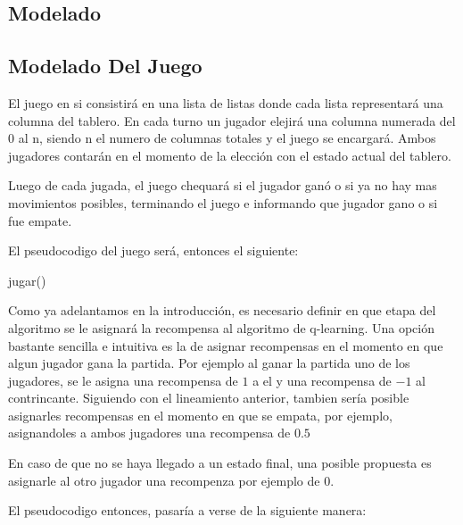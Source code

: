 \subsection{Modelado}


\subsection{Modelado Del Juego}

El juego en si consistirá en una lista de listas donde cada lista representará una columna del tablero. En cada turno un jugador elejirá una columna numerada del 0 al n, siendo n el numero de columnas totales y el juego se encargará. Ambos jugadores contarán en el momento de la elección con el estado actual del tablero.

Luego de cada jugada, el juego chequará si el jugador ganó o si ya no hay mas movimientos posibles, terminando el juego e informando que jugador gano o si fue empate.

El pseudocodigo del juego será, entonces el siguiente:

\begin{algorithm}[h!]
\begin{algorithmic}[1]\parskip=1mm
 \caption{jugar()}
\end{algorithmic}
\end{algorithm}

Como ya adelantamos en la introducción, es necesario definir en que etapa del algoritmo se le asignará la recompensa al algoritmo de q-learning. Una opción bastante sencilla e intuitiva es la de asignar recompensas en el momento en que algun jugador gana la partida. Por ejemplo al ganar la partida uno de los jugadores, se le asigna una recompensa de $1$ a el y una recompensa de $-1$ al contrincante. Siguiendo con el lineamiento anterior, tambien sería posible asignarles recompensas en el momento en que se empata, por ejemplo, asignandoles a ambos jugadores una recompensa de $0.5$

En caso de que no se haya llegado a un estado final, una posible propuesta es asignarle al otro jugador una recompenza por ejemplo de 0.

El pseudocodigo entonces, pasaría a verse de la siguiente manera:

